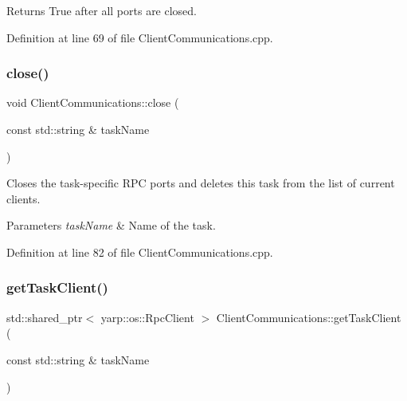 \begin{DoxyReturn}{Returns}
True after all ports are closed. 
\end{DoxyReturn}


Definition at line 69 of file Client\+Communications.\+cpp.

\hypertarget{classocra__recipes_1_1ClientCommunications_ac96c7e76603600459e94b8fa1a0b213e}{}\label{classocra__recipes_1_1ClientCommunications_ac96c7e76603600459e94b8fa1a0b213e} 
\subsubsection{\texorpdfstring{close()}{close()}\hspace{0.1cm}{\footnotesize\ttfamily [2/2]}}
{\footnotesize\ttfamily void Client\+Communications\+::close (\begin{DoxyParamCaption}\item[{const std\+::string \&}]{task\+Name }\end{DoxyParamCaption})}

Closes the task-\/specific R\+PC ports and deletes this task from the list of current clients.


\begin{DoxyParams}{Parameters}
{\em task\+Name} & Name of the task. \\
\hline
\end{DoxyParams}


Definition at line 82 of file Client\+Communications.\+cpp.

\hypertarget{classocra__recipes_1_1ClientCommunications_ad94eda2ba62336ea95b83622d0837543}{}\label{classocra__recipes_1_1ClientCommunications_ad94eda2ba62336ea95b83622d0837543} 
\subsubsection{\texorpdfstring{get\+Task\+Client()}{getTaskClient()}}
{\footnotesize\ttfamily std\+::shared\+\_\+ptr$<$ yarp\+::os\+::\+Rpc\+Client $>$ Client\+Communications\+::get\+Task\+Client (\begin{DoxyParamCaption}\item[{const std\+::string \&}]{task\+Name }\end{DoxyParamCaption})}



